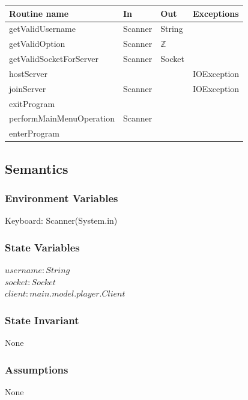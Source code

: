 \documentclass[12pt, titlepage]{article}
\begin{document}
        \begin{tabular}{| l | l | l | p{5cm} |}
            \hline
            \textbf{Routine name} & \textbf{In} & \textbf{Out} & \textbf{Exceptions}\\
            \hline
            getValidUsername & Scanner & String &\\
            \hline
            getValidOption & Scanner & $\mathbb{Z}$ &\\
            \hline 
            getValidSocketForServer & Scanner & Socket &\\
            \hline 
            hostServer & & & IOException\\
            \hline 
            joinServer & Scanner & & IOException\\
            \hline 
            exitProgram & & &\\
            \hline 
            performMainMenuOperation & Scanner & &\\
            \hline 
            enterProgram & & &\\
            \hline 
        \end{tabular}
        
    \subsection* {Semantics}
    
    \subsubsection* {Environment Variables}
        Keyboard: Scanner(System.in)
        
    \subsubsection* {State Variables}
        $\mathit{username}: String$\\
        $\mathit{socket}: Socket$\\
        $\mathit{client} : main.model.player.Client$\\
    
    \subsubsection* {State Invariant}
        None
    
    \subsubsection* {Assumptions}
        None
    
\end{document}

